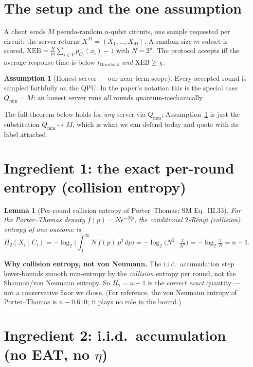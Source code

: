 \documentclass[11pt]{article}
\theoremstyle{definition}
\newtheorem{assumption}{Assumption}
\theoremstyle{plain}
\newtheorem{lemma}{Lemma}
\newcommand{\Fxeb}{\mathrm{XEB}}
\newcommand{\Qmin}{Q_{\min}}
\begin{document}
\section{The setup and the one assumption}

A client sends $M$ pseudo-random $n$-qubit circuits, one sample requested per circuit; the server
returns $X^M=(X_1,\dots,X_M)$. A random size-$m$ subset is scored,
$\Fxeb = \tfrac{N}{m}\sum_{i\in V} p_{C_i}(x_i) - 1$ with $N=2^n$. The protocol accepts iff the
average response time is below $t_{\mathrm{threshold}}$ \emph{and} $\Fxeb \ge \chi$.

\begin{assumption}[Honest server --- our near-term scope]\label{ass:hs}
Every accepted round is sampled faithfully on the QPU. In the paper's notation this is the special
case $\Qmin = M$: an honest server runs \emph{all} rounds quantum-mechanically.
\end{assumption}

\noindent The full theorem below holds for \emph{any} server via $\Qmin$; Assumption~\ref{ass:hs}
is just the substitution $\Qmin\mapsto M$, which is what we can defend today and quote with its
label attached.

\section{Ingredient 1: the exact per-round entropy (collision entropy)}

\begin{lemma}[Per-round collision entropy of Porter--Thomas; SM Eq.~III.33]\label{lem:h2}
For the Porter--Thomas density $f(p)=N e^{-Np}$, the conditional $2$-R\'enyi (collision) entropy
of one outcome is
\[
H_2(X_i\mid C_i)
= -\log_2\!\Big(\textstyle\int_0^\infty N\,f(p)\,p^2\,dp\Big)
= -\log_2\!\Big(N^2\cdot\tfrac{2}{N^3}\Big)
= -\log_2\!\tfrac{2}{N}
= n-1 .
\]
\end{lemma}

\begin{okbox}
\textbf{Why collision entropy, not von Neumann.} The i.i.d.\ accumulation step lower-bounds smooth
min-entropy by the \emph{collision} entropy per round, not the Shannon/von Neumann entropy. So
$H_2=n-1$ is the \emph{correct exact} quantity --- not a conservative floor we chose. (For
reference, the von Neumann entropy of Porter--Thomas is $n-0.610$; it plays no role in the bound.)
\end{okbox}

\section{Ingredient 2: i.i.d.\ accumulation (no EAT, no $\eta$)}
\end{document}
